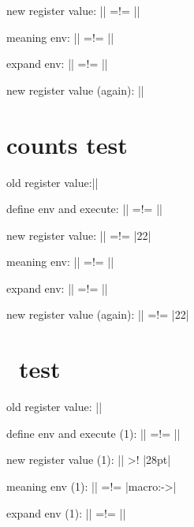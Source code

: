 new register value: |\detokenize\expandafter{\the\mytoks}| =!= ||

meaning env: |\meaning\env| =!= |\meaning\empty|

expand env: |\env| =!= ||

new register value (again): |\detokenize\expandafter{\the\mytoks}|



\section{counts test}

\let\myadvance\advance
\newcount\mycnt
{}\relax
\def\definer{\myadvance\mycnt11 }%

old register value:|\number\mycnt|

define env and execute: |\edef\env{\execute{\definer}}| =!= ||

new register value: |\number\mycnt| =!= |22|

meaning env: |\meaning\env| =!= |\meaning\empty|

expand env: |\env| =!= ||

new register value (again): |\number\mycnt| =!= |22|



\section{\string\@defaultunits\ test}

\def\remove@to@nnil#1\@nnil{}%

\def\@defaultunits{%
    \afterassignment\remove@to@nnil%
}%

\newdimen\mylen

old register value: |\the\mylen|

define env and execute (1): |\edef\env{\execute{\@defaultunits\mylen1cmpt\relax\@nnil}}| =!= ||

new register value (1): |\the\mylen| >! |28pt|

meaning env (1): |\meaning\env| =!= |macro:->|

expand env (1): |\env| =!= ||

